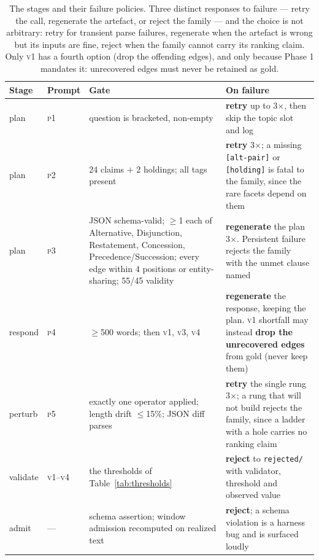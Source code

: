 \documentclass[11pt]{article}
\begin{document}
\begin{table}[h]\centering\small
\renewcommand{\arraystretch}{1.2}
\begin{tabular}{@{}llp{3.9cm}p{5.5cm}@{}}
\toprule
\textbf{Stage} & \textbf{Prompt} & \textbf{Gate} & \textbf{On failure}\\
\midrule
plan    & \textsc{p1} & question is bracketed, non-empty &
  \textbf{retry} up to 3$\times$, then skip the topic slot and log\\
plan    & \textsc{p2} & 24 claims $+$ 2 holdings; all tags present &
  \textbf{retry} 3$\times$; a missing \texttt{[alt-pair]} or \texttt{[holding]} is fatal to the
  family, since the rare facets depend on them\\
plan    & \textsc{p3} & JSON schema-valid; $\geq$1 each of Alternative, Disjunction, Restatement,
  Concession, Precedence/Succession; every edge within 4 positions or entity-sharing; 55/45
  validity &
  \textbf{regenerate} the plan 3$\times$. Persistent failure rejects the family with the unmet
  clause named\\
respond & \textsc{p4} & $\geq$500 words; then \textsc{v1}, \textsc{v3}, \textsc{v4} &
  \textbf{regenerate} the response, keeping the plan. \textsc{v1} shortfall may instead
  \textbf{drop the unrecovered edges} from gold (never keep them)\\
perturb & \textsc{p5} & exactly one operator applied; length drift $\leq$15\%; JSON diff parses &
  \textbf{retry} the single rung 3$\times$; a rung that will not build rejects the family, since a
  ladder with a hole carries no ranking claim\\
validate & \textsc{v1}--\textsc{v4} & the thresholds of Table~\ref{tab:thresholds} &
  \textbf{reject} to \texttt{rejected/} with validator, threshold and observed value\\
admit   & --- & schema assertion; window admission recomputed on realized text &
  \textbf{reject}; a schema violation is a harness bug and is surfaced loudly\\
\bottomrule
\end{tabular}
\caption{The stages and their failure policies. Three distinct responses to failure --- retry the
call, regenerate the artefact, or reject the family --- and the choice is not arbitrary: retry for
transient parse failures, regenerate when the artefact is wrong but its inputs are fine, reject
when the family cannot carry its ranking claim. Only \textsc{v1} has a fourth option (drop the
offending edges), and only because Phase 1 mandates it: unrecovered edges must never be retained
as gold.}
\label{tab:stages}
\end{table}
\end{document}
